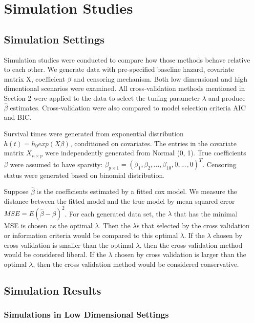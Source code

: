 \documentclass{article}\usepackage[]{graphicx}\usepackage[]{color}
\begin{document}
\section{Simulation Studies}

  \subsection{Simulation Settings}
  
  Simulation studies were conducted to compare how those methods behave relative to each other. We generate data with pre-specified baseline hazard, covariate matrix X, coefficient $\beta$ and censoring mechanism. Both low dimensional and high dimentional scenarios were examined. All cross-validation methods mentioned in Section 2 were applied to the data to select the tuning parameter $\lambda$ and produce $\hat{\beta}$ estimates. Cross-validation were also compared to model selection criteria AIC and BIC.
  
  Survival times were generated from exponential distribution $h(t) = h_{0} exp(X\beta)$, conditioned on covariates. The entries in the covariate matrix $X_{n \times p}$ were independently generated from Normal (0, 1). True coefficients $\beta$  were assumed to have sparsity: $\beta_{p\times 1} = (\beta_{1},\beta_{2}, ..., \beta_{10}, 0, ..., 0)^{T}$.  Censoring status were generated based on binomial distribution.
  
  Suppose $\hat{\beta}$ is the coefficients estimated by a fitted cox model. We measure the distance between the fitted model and the true model by mean squared error $MSE = E(\hat{\beta} - \beta)^2$. For each generated data set, the $\lambda$ that has the minimal MSE is chosen as the optimal $\lambda$. Then the $\lambda$s that selected by the cross validation or information criteria would be compared to this optimal $\lambda$. If the $\lambda$ chosen by cross validation is smaller than the optimal $\lambda$, then the cross validation method would be considered liberal. If the $\lambda$ chosen by cross validation is larger than the optimal $\lambda$, then the cross validation method would be considered conservative. 
  
  \subsection{Simulation Results}
    
    \subsubsection {Simulations in Low Dimensional Settings}
    
\end{document}

